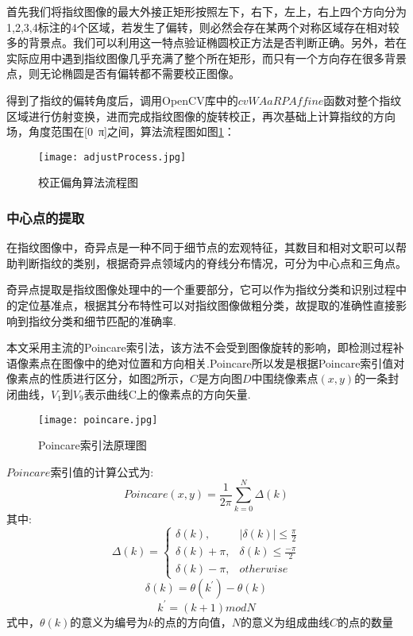 \documentclass[withoutpreface,bwprint]{cumcmthesis} %
\begin{document}
首先我们将指纹图像的最大外接正矩形按照左下，右下，左上，右上四个方向分为1,2,3,4标注的4个区域，若发生了偏转，则必然会存在某两个对称区域存在相对较多的背景点。我们可以利用这一特点验证椭圆校正方法是否判断正确。另外，若在实际应用中遇到指纹图像几乎充满了整个所在矩形，而只有一个方向存在很多背景点，则无论椭圆是否有偏转都不需要校正图像。\par

得到了指纹的偏转角度后，调用OpenCV库中的$cvWAaRPAffine$函数对整个指纹区域进行仿射变换，进而完成指纹图像的旋转校正，再次基础上计算指纹的方向场，角度范围在[0~π]之间，算法流程图如图\ref{fig:adjustProcess}：
\begin{figure}[!h]
	\centering
	\texttt{[image: adjustProcess.jpg]}
	\caption{校正偏角算法流程图}
	\label{fig:adjustProcess}
\end{figure}

\subsubsection{中心点的提取}
在指纹图像中，奇异点是一种不同于细节点的宏观特征，其数目和相对文职可以帮助判断指纹的类别，根据奇异点领域内的脊线分布情况，可分为中心点和三角点\cite{张祖泷2012指纹奇异点精确定位新方法}。

奇异点提取是指纹图像处理中的一个重要部分，它可以作为指纹分类和识别过程中的定位基准点，根据其分布特性可以对指纹图像做粗分类，故提取的准确性直接影响到指纹分类和细节匹配的准确率.

本文采用主流的Poincare索引法，该方法不会受到图像旋转的影响，即检测过程补语像素点在图像中的绝对位置和方向相关.Poincare所以发是根据Poincare索引值对像素点的性质进行区分，如图\ref{fig:poincare}所示，$C$是方向图$D$中围绕像素点$(x,y)$的一条封闭曲线，$V_{1}$到$V_{9}$表示曲线C上的像素点的方向矢量.
\begin{figure}[!h]
	\centering
	\texttt{[image: poincare.jpg]}
	\caption{Poincare索引法原理图}
	\label{fig:poincare}
\end{figure}
$Poincare$索引值的计算公式为:
$$Poincare(x,y)=\frac{1}{2\pi}\sum_{k=0}^{N}\Delta(k)$$
其中:
\begin{equation}
\Delta(k)=
\begin{cases}
\delta(k), & |\delta(k)|\le \frac{\pi}{2} \\
\delta(k)+\pi, & \delta(k)\leq \frac{-\pi}{2} \\
\delta(k)-\pi,  & otherwise   
\end{cases}
\end{equation}
$$\delta(k)= \theta(k^\prime)-\theta(k) $$
$$k^\prime = (k+1)modN $$
式中，$\theta(k)$的意义为编号为$k$的点的方向值，$N$的意义为组成曲线$C$的点的数量
\end{document}
